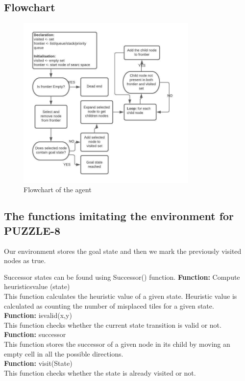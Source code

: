 \documentclass[journal, compsoc]{IEEEtran}
\begin{document}
\subsection{Flowchart}

\begin{figure}[!h]
\centering
\includegraphics[width=3.5in]{images/Week1.jpeg}
\caption{Flowchart of the agent}
\label{fig_sim}
\end{figure}


\subsection{The functions imitating the environment for PUZZLE-8}
Our environment stores the goal state and then we mark the
previously visited nodes as true.

Successor states can be found using Successor() function.
\textbf{Function:} Compute heuristics\textunderscore value (state) \\
This function calculates the heuristic value of a given state.
Heuristic value is calculated as counting the number of misplaced tiles for a given state. \\

\textbf{Function:} is\textunderscore valid(x,y) \\
This function checks whether the current state transition is valid or not. \\

\textbf{Function:} successor \\
This function stores the successor of
a given node in its child by moving an empty cell in all the
possible directions. \\

\textbf{Function:} visit(State) \\
This function checks whether the state is already visited or
not.
\end{document}
